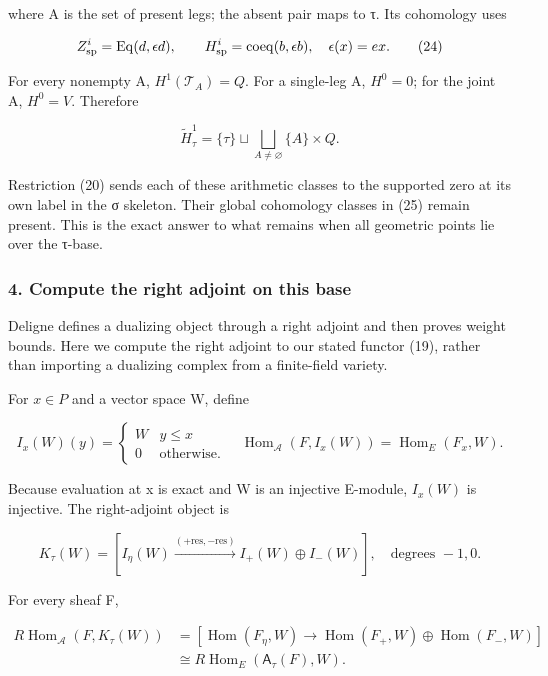 where A is the set of present legs; the absent pair maps to τ. Its cohomology uses

\[
Z^i_{\rm sp}=\operatorname{Eq}(d,\epsilon d),
\qquad
H^i_{\rm sp}=\operatorname{coeq}(b,\epsilon b),
\quad\epsilon(x)=ex.
\tag{24}
\]

For every nonempty A, \(H^1(\mathcal T_A)=Q\). For a single-leg A, \(H^0=0\); for the joint A, \(H^0=V\). Therefore

\[
\widetilde H^1_\tau
=\{\tau\}\sqcup\bigsqcup_{A\ne\varnothing}\{A\}\times Q.
\tag{25}
\]

Restriction (20) sends each of these arithmetic classes to the supported zero at its own label in the σ skeleton. Their global cohomology classes in (25) remain present. This is the exact answer to what remains when all geometric points lie over the τ-base.

\subsubsection{4. Compute the right adjoint on this base}\label{endpoint-tau_base--compute-the-right-adjoint-on-this-base}

Deligne defines a dualizing object through a right adjoint and then proves weight bounds. Here we compute the right adjoint to our stated functor (19), rather than importing a dualizing complex from a finite-field variety.

For \(x\in P\) and a vector space W, define

\[
I_x(W)(y)=\begin{cases}W&y\le x\\0&\text{otherwise}.\end{cases}
\quad
\operatorname{Hom}_{\mathcal A}(F,I_x(W))
=\operatorname{Hom}_E(F_x,W).
\tag{26}
\]

Because evaluation at x is exact and W is an injective E-module, \(I_x(W)\) is injective. The right-adjoint object is

\[
\boxed{
K_\tau(W)=
[I_\eta(W)\xrightarrow{(+\mathrm{res},-\mathrm{res})}
 I_+(W)\oplus I_-(W)],
\quad\text{degrees }-1,0.
}
\tag{27}
\]

For every sheaf F,

\[
\begin{aligned}
R\operatorname{Hom}_{\mathcal A}(F,K_\tau(W))
&=[\operatorname{Hom}(F_\eta,W)
 \longrightarrow\operatorname{Hom}(F_+,W)\oplus\operatorname{Hom}(F_-,W)]\\
&\cong R\operatorname{Hom}_E(\mathsf A_\tau(F),W).
\end{aligned}
\tag{28}
\]

